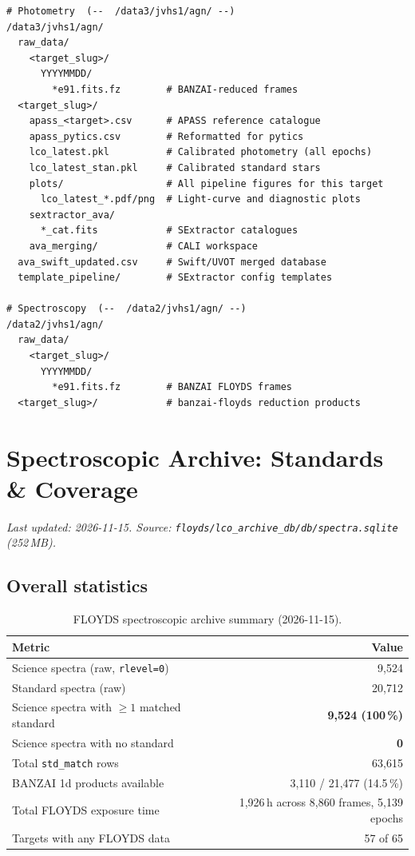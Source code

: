 \documentclass[12pt,a4paper]{article}
\begin{document}
\begin{lstlisting}[style=shell]
# Photometry  (--  /data3/jvhs1/agn/ --)
/data3/jvhs1/agn/
  raw_data/
    <target_slug>/
      YYYYMMDD/
        *e91.fits.fz        # BANZAI-reduced frames
  <target_slug>/
    apass_<target>.csv      # APASS reference catalogue
    apass_pytics.csv        # Reformatted for pytics
    lco_latest.pkl          # Calibrated photometry (all epochs)
    lco_latest_stan.pkl     # Calibrated standard stars
    plots/                  # All pipeline figures for this target
      lco_latest_*.pdf/png  # Light-curve and diagnostic plots
    sextractor_ava/
      *_cat.fits            # SExtractor catalogues
    ava_merging/            # CALI workspace
  ava_swift_updated.csv     # Swift/UVOT merged database
  template_pipeline/        # SExtractor config templates

# Spectroscopy  (--  /data2/jvhs1/agn/ --)
/data2/jvhs1/agn/
  raw_data/
    <target_slug>/
      YYYYMMDD/
        *e91.fits.fz        # BANZAI FLOYDS frames
  <target_slug>/            # banzai-floyds reduction products
\end{lstlisting}


\section{Spectroscopic Archive: Standards \& Coverage}
\label{sec:spec-archive}

\textit{Last updated: 2026-11-15. Source:
\texttt{floyds/lco\_archive\_db/db/spectra.sqlite} (252\,MB).}

\subsection{Overall statistics}

\begin{table}[h!]
\centering
\small
\begin{tabular}{lr}
\toprule
Metric & Value \\
\midrule
Science spectra (raw, \texttt{rlevel=0}) & 9{,}524 \\
Standard spectra (raw) & 20{,}712 \\
Science spectra with $\geq 1$ matched standard & \textbf{9{,}524 (100\,\%)} \\
Science spectra with no standard & \textbf{0} \\
Total \texttt{std\_match} rows & 63{,}615 \\
BANZAI 1d products available & 3{,}110 / 21{,}477 (14.5\,\%) \\
Total FLOYDS exposure time & 1{,}926\,h across 8{,}860 frames, 5{,}139 epochs \\
Targets with any FLOYDS data & 57 of 65 \\
\bottomrule
\end{tabular}
\caption{FLOYDS spectroscopic archive summary (2026-11-15).}
\end{table}
\end{document}
